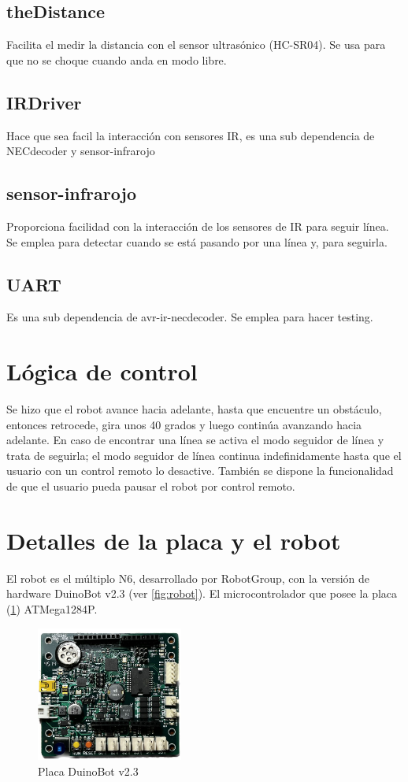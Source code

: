 \documentclass[letterpaper, 10 pt, conference]{ieeeconf}  %
\begin{document}
\subsection{theDistance}
Facilita el medir la distancia con el sensor ultrasónico (HC-SR04). Se usa para que no se choque cuando anda en modo libre.

\subsection{IRDriver}
Hace que sea facil la interacción con sensores IR, es una sub dependencia de NECdecoder y sensor-infrarojo

\subsection{sensor-infrarojo}
Proporciona facilidad con la interacción de los sensores de IR para seguir línea. Se emplea para detectar cuando se está pasando por una línea y, para seguirla.

\subsection{UART}
Es una sub dependencia de avr-ir-necdecoder. Se emplea para hacer testing.

\section{Lógica de control}
Se hizo que el robot avance hacia adelante, hasta que encuentre un obstáculo, entonces retrocede, gira unos 40 grados y luego continúa avanzando hacia adelante. En caso de encontrar una línea se activa el modo seguidor de línea y trata de seguirla; el modo seguidor de línea continua indefinidamente hasta que el usuario con un control remoto lo desactive. También se dispone la funcionalidad de que el usuario pueda pausar el robot por control remoto.

\section{Detalles de la placa y el robot}
El robot es el múltiplo N6, desarrollado por RobotGroup, con la versión de hardware DuinoBot v2.3 (ver \ref{fig:robot}). El microcontrolador que posee la placa (\ref{fig:placa}) ATMega1284P.

\begin{figure}[H]
  \centering
  \includegraphics[width=0.43\textwidth]{./imagenes/placa.png}
  \caption{Placa DuinoBot v2.3}
  \label{fig:placa}
\end{figure}
\end{document}
